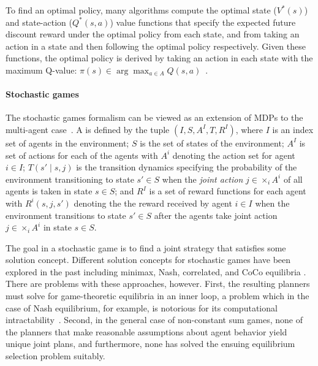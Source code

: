 To find an optimal policy, many algorithms compute the optimal state
($V^*(s)$) and state-action ($Q^*(s,a)$) value functions that specify
the expected future discount reward under the optimal policy from each
state, and from taking an action in a state and then following the
optimal policy respectively. 
Given these functions, the optimal policy is derived by taking an
action in each state with the maximum Q-value: 
$\pi(s) \in \arg\max_{a \in A} Q(s, a)$~\cite{bertsekas87}.

\paragraph{Stochastic games}

The stochastic games formalism can be viewed as an extension of MDPs
to the multi-agent case~\cite{littman1994markov}. 
A  is defined by the tuple $(I, S, A^I, T,
R^I)$, where $I$ is an index set of agents in the environment; $S$ is
the set of states of the environment; $A^I$ is set of actions for each
of the agents with $A^i$ denoting the action set for agent $i \in I$;
$T(s' \mid s, j)$ is the transition dynamics specifying the
probability of the environment transitioning to state $s' \in S$ when
the {\em joint action} $j \in \times_i A^i$ of all agents is taken in
state $s \in S$; and $R^I$ is a set of reward functions for each agent
with $R^i(s, j, s')$ denoting the the reward received by agent
$i \in I$ when the environment transitions to state $s' \in S$ after
the agents take joint action $j \in \times_i A^i$ in state $s \in S$.

The goal in a stochastic game is to find a joint strategy that
satisfies some solution concept. Different solution concepts for
stochastic games have been explored in the past including minimax,
Nash, correlated, and CoCo equilibria
\cite{GreenwaldHall:03,HuWellman03,Littman01,ZGL:06}. There are
problems with these approaches, however. First, the resulting planners
must solve for game-theoretic equilibria in an inner loop, a problem
which in the case of Nash equilibrium, for example, is notorious for
its computational intractability~\cite{daskalakis2009complexity}. Second, in the
general case of non-constant sum games, none of the planners that make
reasonable assumptions about agent behavior yield unique joint plans,
and furthermore, none has solved the ensuing equilibrium selection
problem suitably.

